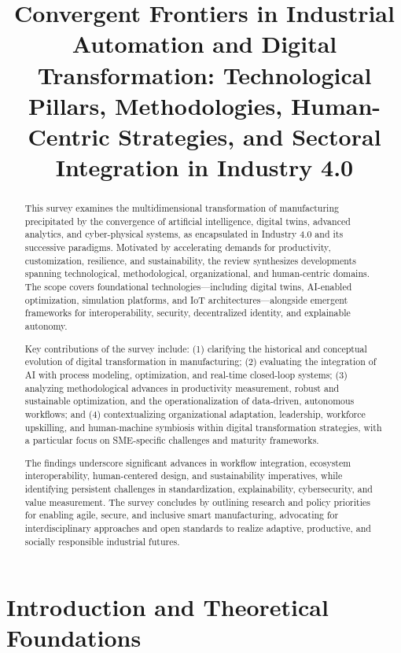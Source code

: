 \documentclass[sigconf]{acmart}
\title{Convergent Frontiers in Industrial Automation and Digital Transformation: Technological Pillars, Methodologies, Human-Centric Strategies, and Sectoral Integration in Industry 4.0}
\begin{document}
\begin{abstract}
This survey examines the multidimensional transformation of manufacturing precipitated by the convergence of artificial intelligence, digital twins, advanced analytics, and cyber-physical systems, as encapsulated in Industry 4.0 and its successive paradigms. Motivated by accelerating demands for productivity, customization, resilience, and sustainability, the review synthesizes developments spanning technological, methodological, organizational, and human-centric domains. The scope covers foundational technologies—including digital twins, AI-enabled optimization, simulation platforms, and IoT architectures—alongside emergent frameworks for interoperability, security, decentralized identity, and explainable autonomy.

Key contributions of the survey include: (1) clarifying the historical and conceptual evolution of digital transformation in manufacturing; (2) evaluating the integration of AI with process modeling, optimization, and real-time closed-loop systems; (3) analyzing methodological advances in productivity measurement, robust and sustainable optimization, and the operationalization of data-driven, autonomous workflows; and (4) contextualizing organizational adaptation, leadership, workforce upskilling, and human-machine symbiosis within digital transformation strategies, with a particular focus on SME-specific challenges and maturity frameworks.

The findings underscore significant advances in workflow integration, ecosystem interoperability, human-centered design, and sustainability imperatives, while identifying persistent challenges in standardization, explainability, cybersecurity, and value measurement. The survey concludes by outlining research and policy priorities for enabling agile, secure, and inclusive smart manufacturing, advocating for interdisciplinary approaches and open standards to realize adaptive, productive, and socially responsible industrial futures.
\end{abstract}

\maketitle

\section{Introduction and Theoretical Foundations}
\end{document}
